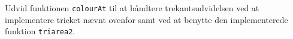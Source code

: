 Udvid funktionen \texttt{colourAt} til at håndtere
  trekantsudvidelsen ved at implementere tricket nævnt ovenfor samt
  ved at benytte den implementerede funktion \lstinline{triarea2}.

